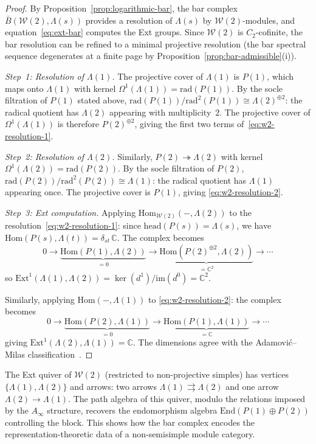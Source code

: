 \begin{proof}
By Proposition~\ref{prop:logarithmic-bar}, the bar complex
$\bar{B}(\mathcal{W}(2), \Lambda(s))$ provides a resolution of
$\Lambda(s)$ by $\mathcal{W}(2)$-modules, and
equation~\eqref{eq:ext-bar} computes the Ext groups.  Since
$\mathcal{W}(2)$ is $C_2$-cofinite, the bar resolution can be
refined to a minimal projective resolution (the bar spectral
sequence degenerates at a finite page by
Proposition~\ref{prop:bar-admissible}(i)).

\emph{Step~1: Resolution of $\Lambda(1)$.}
The projective cover of $\Lambda(1)$ is $P(1)$, which maps
onto $\Lambda(1)$ with kernel
$\Omega^1(\Lambda(1)) = \mathrm{rad}(P(1))$.  By the socle
filtration of $P(1)$ stated above,
$\mathrm{rad}(P(1))/\mathrm{rad}^2(P(1)) \cong
\Lambda(2)^{\oplus 2}$: the radical quotient has $\Lambda(2)$
appearing with multiplicity~$2$.  The projective cover of
$\Omega^1(\Lambda(1))$ is therefore $P(2)^{\oplus 2}$, giving
the first two terms of~\eqref{eq:w2-resolution-1}.

\emph{Step~2: Resolution of $\Lambda(2)$.}
Similarly, $P(2) \twoheadrightarrow \Lambda(2)$ with kernel
$\Omega^1(\Lambda(2)) = \mathrm{rad}(P(2))$.  By the socle
filtration of $P(2)$,
$\mathrm{rad}(P(2))/\mathrm{rad}^2(P(2)) \cong \Lambda(1)$:
the radical quotient has $\Lambda(1)$ appearing once.  The
projective cover is $P(1)$, giving
\eqref{eq:w2-resolution-2}.

\emph{Step~3: Ext computation.}
Applying $\mathrm{Hom}_{\mathcal{W}(2)}(-, \Lambda(2))$ to the
resolution~\eqref{eq:w2-resolution-1}: since
$\mathrm{head}(P(s)) = \Lambda(s)$, we have
$\mathrm{Hom}(P(s), \Lambda(t)) = \delta_{st}\,\mathbb{C}$.
The complex becomes
\[
0 \to \underbrace{\mathrm{Hom}(P(1), \Lambda(2))}_{= 0}
\to \underbrace{\mathrm{Hom}(P(2)^{\oplus 2}, \Lambda(2))}_{= \mathbb{C}^2}
\to \cdots
\]
so $\mathrm{Ext}^1(\Lambda(1), \Lambda(2))
= \ker(d^1)/\mathrm{im}(d^0) = \mathbb{C}^2$.

Similarly, applying $\mathrm{Hom}(-, \Lambda(1))$ to
\eqref{eq:w2-resolution-2}: the complex becomes
\[
0 \to \underbrace{\mathrm{Hom}(P(2), \Lambda(1))}_{= 0}
\to \underbrace{\mathrm{Hom}(P(1), \Lambda(1))}_{= \mathbb{C}}
\to \cdots
\]
giving $\mathrm{Ext}^1(\Lambda(2), \Lambda(1)) = \mathbb{C}$.
The dimensions agree with the Adamovi\'c--Milas
classification~\cite{AdamovicMilas2008}.
\end{proof}

\begin{remark}
\label{rem:w2-ext-quiver}
The Ext quiver of $\mathcal{W}(2)$ (restricted to non-projective
simples) has vertices $\{\Lambda(1), \Lambda(2)\}$ and arrows:
two arrows $\Lambda(1) \rightrightarrows \Lambda(2)$ and one
arrow $\Lambda(2) \to \Lambda(1)$.  The path algebra of this
quiver, modulo the relations imposed by the $A_\infty$ structure,
recovers the endomorphism algebra $\mathrm{End}(P(1) \oplus P(2))$
controlling the block.  This shows how the bar complex encodes the
representation-theoretic data of a non-semisimple module category.
\end{remark}

